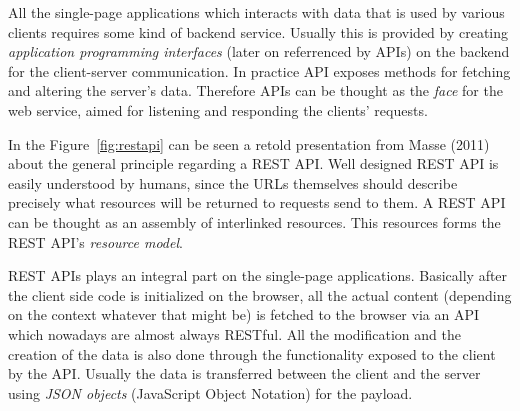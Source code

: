 All the single-page applications which interacts with data that is used by various clients requires some kind of backend service. Usually this is provided by creating \textit{application programming interfaces} (later on referrenced by APIs) on the backend for the client-server communication. In practice API exposes methods for fetching and altering the server's data. Therefore APIs can be thought as the \textit{face} for the web service, aimed for listening and responding the clients' requests. \cite{masse_rest_2011}

In the Figure~\ref{fig:restapi} can be seen a retold presentation from Masse (2011) about the general principle regarding a REST API. Well designed REST API is easily understood by humans, since the URLs themselves should describe precisely what resources will be returned to requests send to them. A REST API can be thought as an assembly of interlinked resources. This resources forms the REST API's \textit{resource model}. \cite{masse_rest_2011}

REST APIs plays an integral part on the single-page applications. Basically after the client side code is initialized on the browser, all the actual content (depending on the context whatever that might be) is fetched to the browser via an API which nowadays are almost always RESTful. All the modification and the creation of the data is also done through the functionality exposed to the client by the API. Usually the data is transferred between the client and the server using \textit{JSON objects} (JavaScript Object Notation) for the payload.















